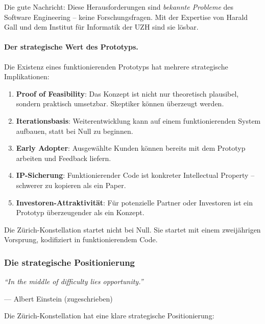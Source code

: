 Die gute Nachricht: Diese Herausforderungen sind \textit{bekannte Probleme} des Software Engineering -- keine Forschungsfragen. Mit der Expertise von Harald Gall und dem Institut für Informatik der UZH sind sie lösbar.

\paragraph{Der strategische Wert des Prototyps.}

Die Existenz eines funktionierenden Prototyps hat mehrere strategische Implikationen:

\begin{enumerate}
    \item \textbf{Proof of Feasibility}: Das Konzept ist nicht nur theoretisch plausibel, sondern praktisch umsetzbar. Skeptiker können überzeugt werden.

    \item \textbf{Iterationsbasis}: Weiterentwicklung kann auf einem funktionierenden System aufbauen, statt bei Null zu beginnen.

    \item \textbf{Early Adopter}: Ausgewählte Kunden können bereits mit dem Prototyp arbeiten und Feedback liefern.

    \item \textbf{IP-Sicherung}: Funktionierender Code ist konkreter Intellectual Property -- schwerer zu kopieren als ein Paper.

    \item \textbf{Investoren-Attraktivität}: Für potenzielle Partner oder Investoren ist ein Prototyp überzeugender als ein Konzept.
\end{enumerate}

Die Zürich-Konstellation startet nicht bei Null. Sie startet mit einem zweijährigen Vorsprung, kodifiziert in funktionierendem Code.

\subsubsection{Die strategische Positionierung}

\epigraph{\textit{``In the middle of difficulty lies opportunity.''}}{--- Albert Einstein (zugeschrieben)}

Die Zürich-Konstellation hat eine klare strategische Positionierung:

